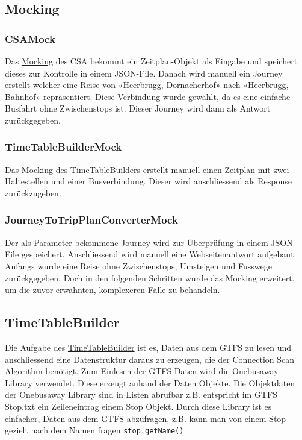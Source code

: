 \subsection{Mocking}


\subsubsection{CSAMock}
Das \hyperlink{mocking}{Mocking} des CSA bekommt ein Zeitplan-Objekt als Eingabe und speichert dieses zur Kontrolle in einem JSON-File. Danach wird manuell ein Journey erstellt welcher eine Reise von «Heerbrugg, Dornacherhof» nach «Heerbrugg, Bahnhof» repräsentiert. Diese Verbindung wurde gewählt, da es eine einfache Busfahrt ohne Zwischenstops ist. Dieser Journey wird dann als Antwort zurückgegeben.

\subsubsection{TimeTableBuilderMock}
Das Mocking des TimeTableBuilders erstellt manuell einen Zeitplan mit zwei Haltestellen und einer Busverbindung. Dieser wird anschliessend als Response zurückzugeben.

\subsubsection{JourneyToTripPlanConverterMock}
Der als Parameter bekommene Journey wird zur Überprüfung in einem JSON-File gespeichert. Anschliessend wird manuell eine Webseitenantwort aufgebaut. Anfangs wurde eine Reise ohne Zwischenstops, Umsteigen und Fusswege zurückgegeben. Doch in den folgenden Schritten wurde das Mocking erweitert, um die zuvor erwähnten, komplexeren Fälle zu behandeln.

\subsection{TimeTableBuilder}
Die Aufgabe des \hyperlink{timeTableBuilder}{TimeTableBuilder} ist es, Daten aus dem GTFS zu lesen und anschliessend eine Datenstruktur daraus zu erzeugen, die der Connection Scan Algorithm benötigt. Zum Einlesen der GTFS-Daten wird die Onebusaway Library verwendet. Diese erzeugt anhand der Daten Objekte. Die Objektdaten der Onebusaway Library sind in Listen abrufbar z.B. entspricht im GTFS Stop.txt ein Zeileneintrag einem Stop Objekt. Durch diese Library ist es einfacher, Daten aus dem GTFS abzufragen, z.B. kann man von einem Stop gezielt nach dem Namen fragen \texttt{stop.getName()}.\newline  

